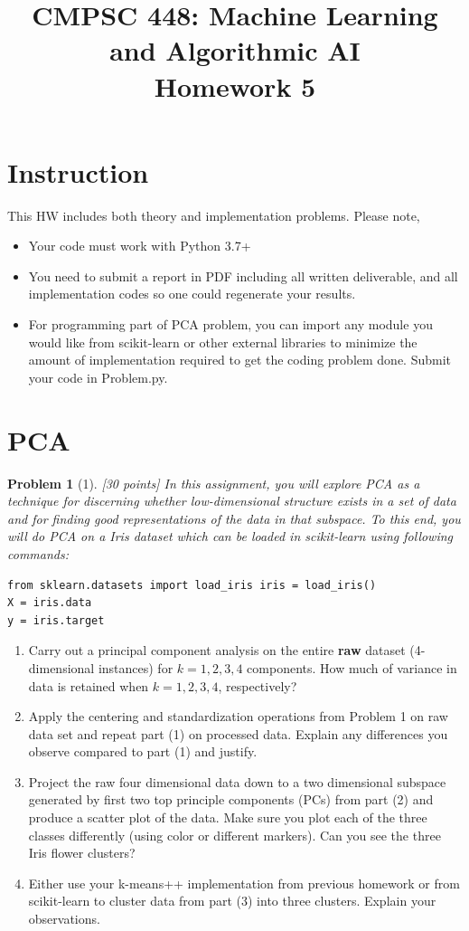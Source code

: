 \documentclass[12pt]{article}
\title{CMPSC 448: Machine Learning and Algorithmic AI \\ Homework 5}
\author{}
\date{}
\theoremstyle{quest}
\newtheorem*{problem}{Problem}
\begin{document}
\maketitle

\section*{Instruction}
This HW includes both theory and implementation problems. Please note,
\begin{itemize}
    \item Your code must work with Python 3.7+
    \item You need to submit a report in PDF including all written deliverable, and all implementation codes so one could regenerate your results.
    \item For programming part of PCA problem, you can import any module you would like from \textsf{scikit-learn} or other external libraries to minimize the amount of implementation required to get the coding problem done. Submit your code in \textsf{Problem.py}.
\end{itemize}

\section*{PCA}
\begin{problem}[1] [30 points]
In this assignment, you will explore PCA as a technique for discerning whether low-dimensional structure exists in a set of data and for finding good representations of the data in that subspace. To this end, you will do PCA on a Iris dataset which can be loaded in \textsf{scikit-learn} using following commands:
\end{problem}

\begin{verbatim}
from sklearn.datasets import load_iris iris = load_iris()
X = iris.data
y = iris.target
\end{verbatim}

\begin{enumerate}
    \item Carry out a principal component analysis on the entire \textbf{raw} dataset (4-dimensional instances) for $k = 1, 2, 3, 4$ components. How much of variance in data is retained when $k=1,2,3,4$, respectively?
    \item Apply the centering and standardization operations from Problem 1 on raw data set and repeat part (1) on processed data. Explain any differences you observe compared to part (1) and justify.
    \item Project the raw four dimensional data down to a two dimensional subspace generated by first two top principle components (PCs) from part (2) and produce a scatter plot of the data. Make sure you plot each of the three classes differently (using color or different markers). Can you see the three Iris flower clusters?
    \item Either use your k-means++ implementation from previous homework or from \textsf{scikit-learn} to cluster data from part (3) into three clusters. Explain your observations.
\end{enumerate}
\end{document}
